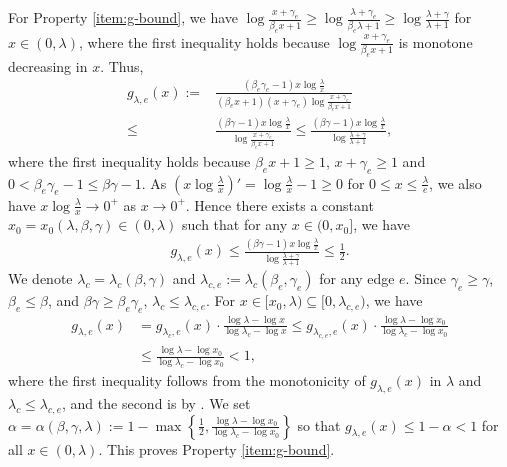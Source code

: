 \documentclass[11pt]{amsart}
\newcommand{\defeq}{:=}
\theoremstyle{definition}
\theoremstyle{remark}
\begin{document}
For Property \eqref{item:g-bound},
we have $\log \frac{x+\gamma_e}{\beta_e x+1}\geq \log \frac{\lambda+\gamma_e}{\beta_e \lambda+1}\geq \log \frac{\lambda+\gamma}{\lambda+1}$ for $x\in (0,\lambda)$, where the first inequality holds because $\log \frac{x+\gamma_e}{\beta_e x+1}$ is monotone decreasing in $x$.
Thus,
\begin{align*}
    g_{\lambda,e}(x):=&\frac{(\beta_e\gamma_e-1)x\log\frac{\lambda}{x}}{(\beta_ex+1)(x+\gamma_e)\log\frac{x+\gamma_e}{\beta_e x+1}}\\
    \leq & \frac{(\beta\gamma-1)x\log\frac{\lambda}{x}}{\log\frac{x+\gamma_e}{\beta_e x+1}}\leq \frac{(\beta\gamma-1)x\log\frac{\lambda}{x}}{\log \frac{\lambda+\gamma}{\lambda+1}},
\end{align*}
where the first inequality holds because $\beta_ex+1\geq 1$, $x+\gamma_e\geq 1$ and $0<\beta_e\gamma_e-1\leq \beta\gamma-1$. 
As $(x\log \frac{\lambda}{x})' = \log \frac{\lambda}{x} - 1\geq 0$ for $0\leq x\leq \frac{\lambda}{e}$, we also have $x\log \frac{\lambda}{x}\to 0^+$ as $x\to 0^+$. 
Hence there exists a constant $x_0=x_0(\lambda,\beta,\gamma)\in (0,\lambda)$ such that for any $x\in (0,x_0]$, we have
\begin{align*}
    g_{\lambda,e}(x)\leq \frac{(\beta\gamma-1)x\log\frac{\lambda}{x}}{\log \frac{\lambda+\gamma}{\lambda+1}}\leq \frac{1}{2}.
\end{align*}
We denote $\lambda_c=\lambda_c(\beta,\gamma)$ and $\lambda_{c,e}\defeq\lambda_c(\beta_e,\gamma_e)$ for any edge $e$.
Since $\gamma_e\ge \gamma$, $\beta_e\le\beta$, and $\beta\gamma\ge\beta_e\gamma_e$,
$\lambda_c\le \lambda_{c,e}$.
For $x\in [x_0,\lambda)\subseteq [0,\lambda_{c,e})$, we have
\begin{align*}
  g_{\lambda,e}(x) & = g_{\lambda_c,e}(x)\cdot \frac{\log \lambda - \log x}{\log \lambda_c - \log x}
  \leq g_{\lambda_{c,e},e}(x)\cdot \frac{\log \lambda - \log x_0}{\log \lambda_c - \log x_0}\\
  &\le  \frac{\log \lambda - \log x_0}{\log \lambda_c - \log x_0} < 1,
\end{align*}
where the first inequality follows from the monotonicity of $g_{\lambda,e}(x)$ in $\lambda$ and $\lambda_c\le \lambda_{c,e}$,
and the second is by .
We set $\alpha = \alpha(\beta,\gamma,\lambda) \defeq 1 - \max\left\{\frac{1}{2}, \frac{\log \lambda - \log x_0}{\log \lambda_c - \log x_0}\right\}$ so that $g_{\lambda,e}(x) \leq 1-\alpha < 1$ for all $x \in (0,\lambda)$. 
This proves Property \eqref{item:g-bound}.
\end{document}
